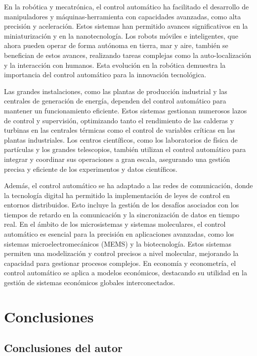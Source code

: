 \documentclass[journal, table]{IEEEtran}
\begin{document}
En la robótica y mecatrónica, el control automático ha facilitado el desarrollo
de manipuladores y máquinas-herramienta con capacidades avanzadas, como alta
precisión y aceleración.
Estos sistemas han permitido avances significativos en la miniaturización y en
la nanotecnología.
Los robots móviles e inteligentes, que ahora pueden operar de forma autónoma en
tierra, mar y aire, también se benefician de estos avances, realizando tareas
complejas como la auto-localización y la interacción con humanos.
Esta evolución en la robótica demuestra la importancia del control automático
para la innovación tecnológica.

Las grandes instalaciones, como las plantas de producción industrial y las
centrales de generación de energía, dependen del control automático para
mantener un funcionamiento eficiente.
Estos sistemas gestionan numerosos lazos de control y supervisión, optimizando
tanto el rendimiento de las calderas y turbinas en las centrales térmicas como
el control de variables críticas en las plantas industriales.
Los centros científicos, como los laboratorios de física de partículas y los
grandes telescopios, también utilizan el control automático para integrar y
coordinar sus operaciones a gran escala, asegurando una gestión precisa y
eficiente de los experimentos y datos científicos.

Además, el control automático se ha adaptado a las redes de comunicación,
donde la tecnología digital ha permitido la implementación de leyes de control
en entornos distribuidos.
Esto incluye la gestión de los desafíos asociados con los tiempos de retardo en
la comunicación y la sincronización de datos en tiempo real.
En el ámbito de los microsistemas y sistemas moleculares, el control automático
es esencial para la precisión en aplicaciones avanzadas, como los sistemas
microelectromecánicos (MEMS) y la biotecnología.
Estos sistemas permiten una modelización y control precisos a nivel molecular,
mejorando la capacidad para gestionar procesos complejos.
En economía y econometría, el control automático se aplica a modelos económicos,
destacando su utilidad en la gestión de sistemas económicos globales
interconectados.

\section{Conclusiones}%
\label{sec:Conclusiones}

\subsection{Conclusiones del autor}%
\label{sub:Conclusiones del autor}
\end{document}
